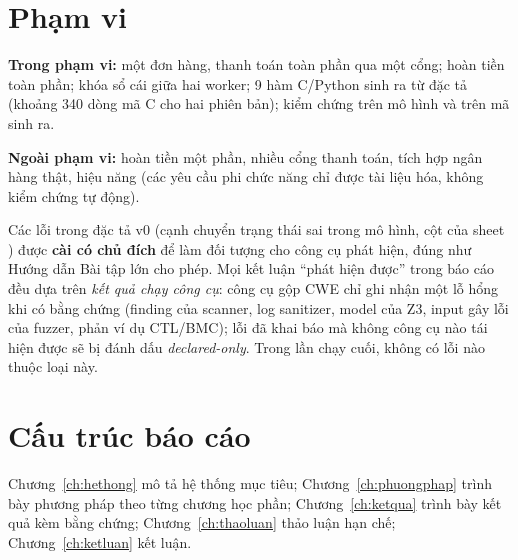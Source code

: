 \section{Phạm vi}
\textbf{Trong phạm vi:} một đơn hàng, thanh toán toàn phần qua một cổng; hoàn tiền toàn phần;
khóa sổ cái giữa hai worker; 9 hàm C/Python sinh ra từ đặc tả (khoảng 340 dòng mã C cho hai
phiên bản); kiểm chứng trên mô hình và trên mã sinh ra.

\textbf{Ngoài phạm vi:} hoàn tiền một phần, nhiều cổng thanh toán, tích hợp ngân hàng thật,
hiệu năng (các yêu cầu phi chức năng chỉ được tài liệu hóa, không kiểm chứng tự động).

\begin{ghichu}
Các lỗi trong đặc tả v0 (cạnh chuyển trạng thái sai trong mô hình, cột  của sheet
) được \textbf{cài có chủ đích} để làm đối tượng cho công cụ phát hiện, đúng như
Hướng dẫn Bài tập lớn cho phép. Mọi kết luận ``phát hiện được'' trong báo cáo đều dựa trên
\emph{kết quả chạy công cụ}: công cụ gộp CWE chỉ ghi nhận một lỗ hổng khi có bằng chứng
(finding của scanner, log sanitizer, model của Z3, input gây lỗi của fuzzer, phản ví dụ
CTL/BMC); lỗi đã khai báo mà không công cụ nào tái hiện được sẽ bị đánh dấu
\emph{declared-only}. Trong lần chạy cuối, không có lỗi nào thuộc loại này.
\end{ghichu}

\section{Cấu trúc báo cáo}
Chương~\ref{ch:hethong} mô tả hệ thống mục tiêu; Chương~\ref{ch:phuongphap} trình bày
phương pháp theo từng chương học phần; Chương~\ref{ch:ketqua} trình bày kết quả kèm bằng
chứng; Chương~\ref{ch:thaoluan} thảo luận hạn chế; Chương~\ref{ch:ketluan} kết luận.
